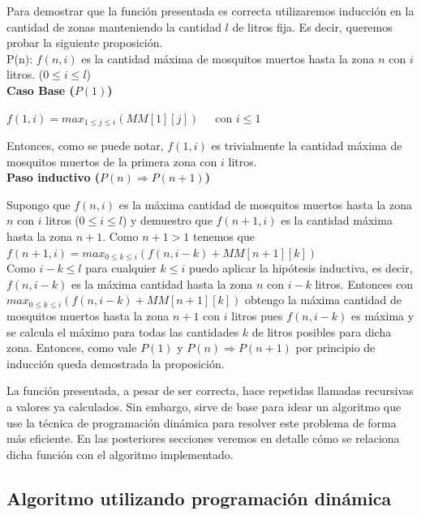 \documentclass[a4paper,10pt] {article}
\begin{document}
Para demostrar que la funci\'on presentada es correcta utilizaremos inducci\'on en la cantidad de zonas manteniendo la cantidad $l$ de litros fija. Es decir, queremos probar la siguiente proposición. \\

P(n): $f(n, i)$ es la cantidad máxima de mosquitos muertos hasta la zona $n$ con $i$ litros. ($0 \leq i \leq l$) \\

\textbf{Caso Base ($P(1)$)}

$f(1,i) = max_{1 \leq j \leq i} (MM[1][j]) \;\;\;\; $ con $i \leq 1$

Entonces, como se puede notar, $f(1,i)$ es trivialmente la cantidad máxima de mosquitos muertos de la primera zona con $i$ litros. \\

\textbf{Paso inductivo ($P(n) \Rightarrow P(n+1)$)}

Supongo que $f(n,i)$ es la máxima cantidad de mosquitos muertos hasta la zona $n$ con $i$ litros ($0 \leq i \leq l$) y demuestro que $f(n+1,i)$ es la cantidad máxima hasta la zona $n+1$.
Como $n+1 > 1$ tenemos que \\

$f(n+1,i) = max_{0 \leq k \leq i} (f(n, i-k) + MM[n+1][k])$ \\

Como $i - k \leq l$ para cualquier $k \leq i$ puedo aplicar la hipótesis inductiva, es decir, $f(n,i-k)$ es la máxima cantidad hasta la zona $n$ con $i-k$ litros. Entonces con $max_{0 \leq k \leq i} (f(n, i-k) + MM[n+1][k])$ obtengo la máxima cantidad de mosquitos muertos hasta la zona $n+1$ con $i$ litros pues $f(n,i-k)$ es máxima y se calcula el máximo para todas las cantidades $k$ de litros posibles para dicha zona. Entonces, como vale $P(1)$ y $P(n) \Rightarrow P(n+1)$ por principio de inducci\'on queda demostrada la proposici\'on.

La función presentada, a pesar de ser correcta, hace repetidas llamadas recursivas a valores ya calculados. Sin embargo, sirve de base para idear un algoritmo que use la técnica de programación dinámica para resolver este problema de forma más eficiente. En las posteriores secciones veremos en detalle cómo se relaciona dicha función con el algoritmo implementado.

\subsection*{Algoritmo utilizando programación dinámica}
\end{document}
